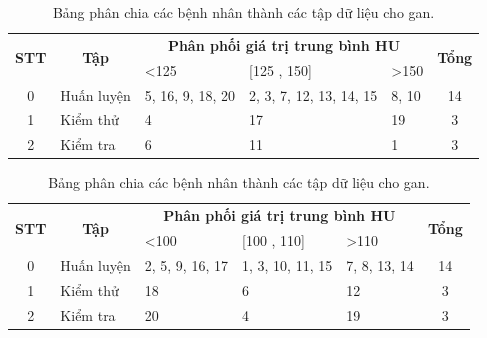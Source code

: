\begin{table}[H]
    \centering
    \begin{tabular}{|c|l|l|l|l|c|}
    \hline
    \multicolumn{1}{|c|}{\multirow{2}{*}{\textbf{STT}}} & \multicolumn{1}{c|}{\multirow{2}{*}{\textbf{Tập}}} & \multicolumn{3}{c|}{\textbf{Phân phối giá trị trung bình HU}}       & \multirow{2}{*}{\textbf{Tổng}} \\ \cline{3-5}
    \multicolumn{1}{|c|}{}                     & \multicolumn{1}{c|}{}                     & \textless{}125 & {[}125 , 150{]}        & \textgreater 150 &                       \\ \hline
    0 & Huấn luyện   & 5, 16, 9, 18, 20  & 2, 3, 7, 12, 13, 14, 15 & 8, 10    & 14                    \\ \hline
    1 & Kiểm thử     & 4             & 17                     & 19          & 3                     \\ \hline
    2 & Kiểm tra     & 6             & 11                     & 1           & 3                     \\ \hline
    
    \end{tabular}
    \caption{Bảng phân chia các bệnh nhân thành các tập dữ liệu cho mạch máu.}
    \label{tab:training-set-vessel}
    \begin{tabular}{|c|l|l|l|l|c|}
    \hline
    \multicolumn{1}{|c|}{\multirow{2}{*}{\textbf{STT}}} & \multicolumn{1}{c|}{\multirow{2}{*}{\textbf{Tập}}} & \multicolumn{3}{c|}{\textbf{Phân phối giá trị trung bình HU}}       & \multirow{2}{*}{\textbf{Tổng}} \\ \cline{3-5}
    \multicolumn{1}{|c|}{}                     & \multicolumn{1}{c|}{}                     & \textless{}100 & {[}100 , 110{]}        & \textgreater 110 &                       \\ \hline
    0                                          & Huấn luyện                                & 2, 5, 9, 16, 17  & 1, 3, 10, 11, 15 & 7, 8, 13, 14       & 14                    \\ \hline
    1                                          & Kiểm thử                                  & 18             & 6                     & 12               & 3                     \\ \hline
    2                                          & Kiểm tra                                  & 20              & 4                     & 19              & 3                     \\ \hline
    \end{tabular}
    \caption{Bảng phân chia các bệnh nhân thành các tập dữ liệu cho gan.}
\end{table}

